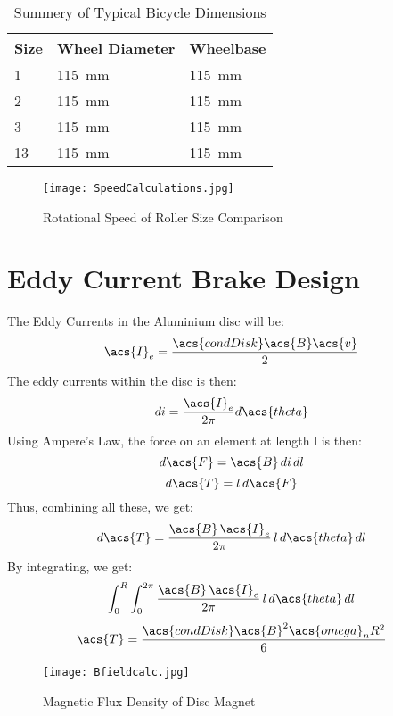 \begin{table}[H]
	\color{red} %
	\renewcommand{\arraystretch}{1.2}
	\centering
	\caption{Summery of Typical Bicycle Dimensions}
	\begin{tabularx}{\textwidth}{p{1.4cm} >{\raggedright}p{5cm} >{\raggedright\arraybackslash}X}
		\toprule
		Size & Wheel Diameter         & Wheelbase              \\
		\midrule
		1    & \SI{115}{\milli\meter} & \SI{115}{\milli\meter} \\
		2    & \SI{115}{\milli\meter} & \SI{115}{\milli\meter} \\
		3    & \SI{115}{\milli\meter} & \SI{115}{\milli\meter} \\
		13   & \SI{115}{\milli\meter} & \SI{115}{\milli\meter} \\
		\bottomrule
	\end{tabularx}
	\label{tab:bikesize}
\end{table}

\begin{figure}[H]
	\begin{center}
		\texttt{[image: SpeedCalculations.jpg]}
		\caption{Rotational Speed of Roller Size Comparison}
		\label{fig:speedCalc}
	\end{center}
\end{figure}

\color{black}
\newpage

\section{Eddy Current Brake Design}
\color{red} %

The Eddy Currents in the Aluminium disc will be:
\[
	\acs{I}_e = \frac{\acs{condDisk} \acs{B} \acs{v}}{2}
\]
The eddy currents within the disc is then:
\[
	di = \frac{\acs{I}_e}{2 \pi} d\acs{theta}
\]
Using Ampere's Law, the force on an element at length l is then:
\[
	d\acs{F} = \acs{B} \, di \, dl
\]
\[
	d\acs{T} = l \, d\acs{F}
\]
Thus, combining all these, we get:
\[
	d\acs{T} = \frac{\acs{B} \, \acs{I}_e}{2 \pi} \, l \, d\acs{theta} \, dl
\]
By integrating, we get:
\[
	\int_{0}^{R} \int_{0}^{2 \pi} \frac{\acs{B} \, \acs{I}_e}{2 \pi} \, l \, d\acs{theta} \, dl
\]
\[
	\acs{T} = \frac{\acs{condDisk}\acs{B}^2\acs{omega}_n R^2}{6}
\]

\begin{figure}[H]
	\begin{center}
		\texttt{[image: Bfieldcalc.jpg]}
		\caption{Magnetic Flux Density of Disc Magnet}
		\citep[Addapted from][]{Supermagnete:2010}
		\label{fig:B0}
	\end{center}
\end{figure}


